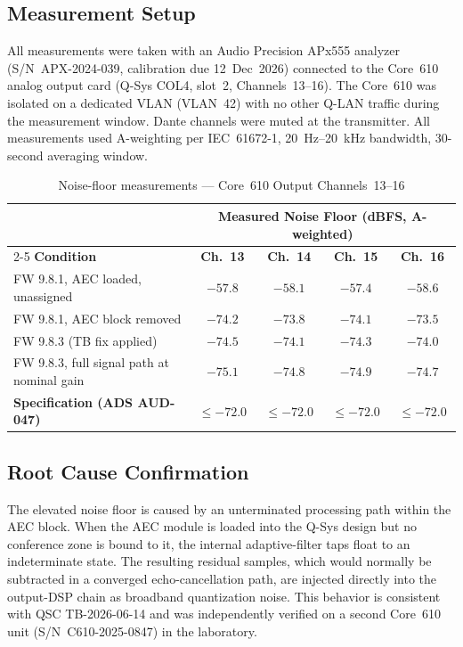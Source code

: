 \documentclass[11pt,letterpaper]{article}
\begin{document}
\subsection{Measurement Setup}

All measurements were taken with an Audio Precision APx555 analyzer
(S/N~APX-2024-039, calibration due 12~Dec~2026) connected to the Core~610
analog output card (Q-Sys COL4, slot~2, Channels~13--16). The Core~610 was
isolated on a dedicated VLAN (VLAN~42) with no other Q-LAN traffic during the
measurement window. Dante channels were muted at the transmitter. All
measurements used A-weighting per IEC~61672-1, 20~Hz--20~kHz bandwidth,
30-second averaging window.

\begin{table}[H]
\centering
\caption{Noise-floor measurements --- Core~610 Output Channels~13--16}
\medskip
\begin{tabular}{@{}lcccc@{}}
\toprule
& \multicolumn{4}{c}{\textbf{Measured Noise Floor (dBFS, A-weighted)}} \\
\cmidrule(lr){2-5}
\textbf{Condition} & \textbf{Ch.\ 13} & \textbf{Ch.\ 14} & \textbf{Ch.\ 15} & \textbf{Ch.\ 16} \\
\midrule
FW 9.8.1, AEC loaded, unassigned                          & $-57.8$ & $-58.1$ & $-57.4$ & $-58.6$ \\
FW 9.8.1, AEC block removed                               & $-74.2$ & $-73.8$ & $-74.1$ & $-73.5$ \\
\rowcolor{rowstripe}FW 9.8.3 (TB fix applied)             & $-74.5$ & $-74.1$ & $-74.3$ & $-74.0$ \\
FW 9.8.3, full signal path at nominal gain                & $-75.1$ & $-74.8$ & $-74.9$ & $-74.7$ \\
\midrule
\rowcolor{palebg}\textbf{Specification (ADS AUD-047)}   & $\leq -72.0$ & $\leq -72.0$ & $\leq -72.0$ & $\leq -72.0$ \\
\bottomrule
\end{tabular}
\end{table}

\subsection{Root Cause Confirmation}

The elevated noise floor is caused by an unterminated processing path within the
AEC block. When the AEC module is loaded into the Q-Sys design but no conference
zone is bound to it, the internal adaptive-filter taps float to an
indeterminate state. The resulting residual samples, which would normally be
subtracted in a converged echo-cancellation path, are injected directly into the
output-DSP chain as broadband quantization noise. This behavior is consistent
with QSC TB-2026-06-14 and was independently verified on a second Core~610 unit
(S/N~C610-2025-0847) in the laboratory.
\end{document}
